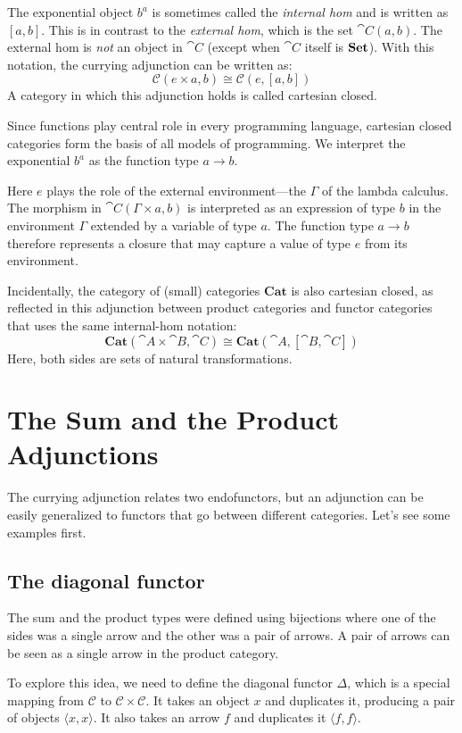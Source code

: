 \documentclass[DaoFP]{subfiles}
\begin{document}
The exponential object $b^a$ is sometimes called the \emph{internal hom} and is written as $[a, b]$. This is in contrast to the \emph{external hom}, which is the set $\cat C (a, b)$. The external hom is \emph{not} an object in $\cat C$ (except when $\cat C$ itself is $\mathbf{Set}$). With this notation, the currying adjunction can be written as:
\[  \mathcal{C}(e \times a, b) \cong  \mathcal{C} (e, [a, b])  \]
A category in which this adjunction holds is called cartesian closed.

Since functions play central role in every programming language, cartesian closed categories form the basis of all models of programming. We interpret the exponential $b^a$ as the function type $a \to b$. 

Here $e$ plays the role of the external environment---the $\Gamma$ of the lambda calculus. The morphism in $\cat C(\Gamma \times a, b)$ is interpreted as an expression of type $b$ in the environment $\Gamma$ extended by a variable of type $a$. The function type $a \to b$ therefore represents a closure that may capture a value of type $e$ from its environment.

Incidentally, the category of (small) categories $\mathbf{Cat}$ is also cartesian closed, as reflected in this adjunction between product categories and functor categories that uses the same internal-hom notation:
\[ \mathbf{Cat} (\cat A \times \cat B, \cat C) \cong \mathbf{Cat} (\cat A, [\cat B, \cat C]) \]
Here, both sides are sets of natural transformations.


\section{The Sum and the Product Adjunctions}

The currying adjunction relates two endofunctors, but an adjunction can be easily generalized to functors that go between different categories. Let's see some examples first.

\subsection{The diagonal functor}

The sum and the product types were defined using bijections where one of the sides was a single arrow and the other was a pair of arrows. A pair of arrows can be seen as a single arrow in the product category. 

To explore this idea, we need to define the diagonal functor $\Delta$, which is a special mapping from $\mathcal{C}$ to $\mathcal{C} \times \mathcal{C}$. It takes an object $x$ and duplicates it, producing a pair of objects $\langle x, x \rangle$. It also takes an arrow $f$ and duplicates it $\langle f, f \rangle$.
\end{document}
